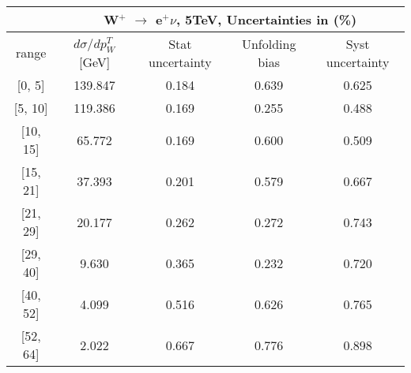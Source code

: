 \documentclass[12pt]{article}
\begin{document}
 
\begin{table}[] 
\begin{tabular}{c|c|c|c|c|}
\cline{2-5}
& \multicolumn{4}{c|}{W$^{+}$ $\rightarrow$ e$^{+} \nu $, 5TeV, Uncertainties in (\%)}  \\ \hline \hline 
\multicolumn{1}{|c|}{  range } & $d\sigma$/$dp^{T}_{W}$ [GeV]     & Stat uncertainty     & Unfolding bias     & Syst uncertainty        \\ \hline \hline 
\multicolumn{1}{|c|}{{[}0,  5{]}}  & 139.847 & 0.184 & 0.639 & 0.625 \\ \hline 
\multicolumn{1}{|c|}{{[}5,  10{]}}  & 119.386 & 0.169 & 0.255 & 0.488 \\ \hline 
\multicolumn{1}{|c|}{{[}10,  15{]}}  & 65.772 & 0.169 & 0.600 & 0.509 \\ \hline 
\multicolumn{1}{|c|}{{[}15,  21{]}}  & 37.393 & 0.201 & 0.579 & 0.667 \\ \hline 
\multicolumn{1}{|c|}{{[}21,  29{]}}  & 20.177 & 0.262 & 0.272 & 0.743 \\ \hline 
\multicolumn{1}{|c|}{{[}29,  40{]}}  & 9.630 & 0.365 & 0.232 & 0.720 \\ \hline 
\multicolumn{1}{|c|}{{[}40,  52{]}}  & 4.099 & 0.516 & 0.626 & 0.765 \\ \hline 
\multicolumn{1}{|c|}{{[}52,  64{]}}  & 2.022 & 0.667 & 0.776 & 0.898 \\ \hline 
\end{tabular}
\end{table}
\end{document}
